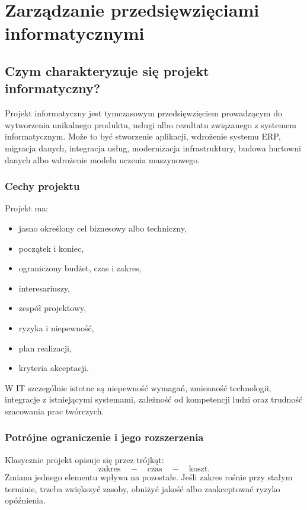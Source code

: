 \section{Zarządzanie przedsięwzięciami informatycznymi}

\subsection{Czym charakteryzuje się projekt informatyczny?}

Projekt informatyczny jest tymczasowym przedsięwzięciem prowadzącym do wytworzenia unikalnego produktu, usługi albo rezultatu związanego z systemem informatycznym. Może to być stworzenie aplikacji, wdrożenie systemu ERP, migracja danych, integracja usług, modernizacja infrastruktury, budowa hurtowni danych albo wdrożenie modelu uczenia maszynowego.

\subsubsection{Cechy projektu}

Projekt ma:
\begin{itemize}
  \item jasno określony cel biznesowy albo techniczny,
  \item początek i koniec,
  \item ograniczony budżet, czas i zakres,
  \item interesariuszy,
  \item zespół projektowy,
  \item ryzyka i niepewność,
  \item plan realizacji,
  \item kryteria akceptacji.
\end{itemize}

W IT szczególnie istotne są niepewność wymagań, zmienność technologii, integracje z istniejącymi systemami, zależność od kompetencji ludzi oraz trudność szacowania prac twórczych.

\subsubsection{Potrójne ograniczenie i jego rozszerzenia}

Klasycznie projekt opisuje się przez trójkąt:
\[
\text{zakres} \quad-\quad \text{czas} \quad-\quad \text{koszt}.
\]
Zmiana jednego elementu wpływa na pozostałe. Jeśli zakres rośnie przy stałym terminie, trzeba zwiększyć zasoby, obniżyć jakość albo zaakceptować ryzyko opóźnienia.


